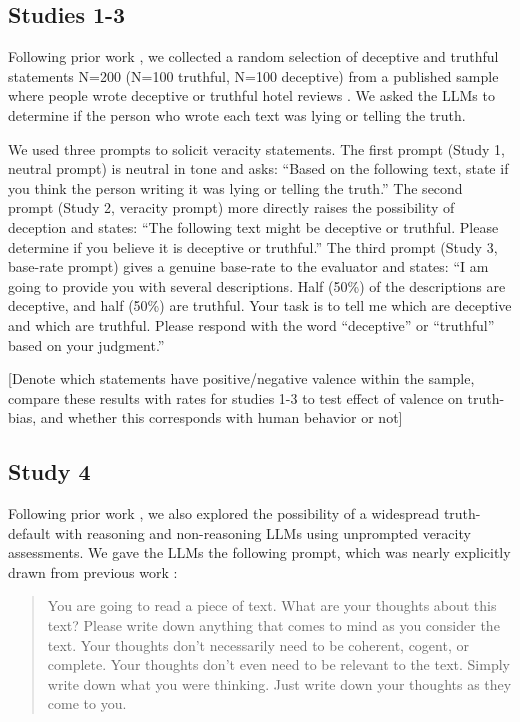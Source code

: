 \documentclass{article}
\begin{document}
\subsection{Studies 1-3}

Following prior work \citep{markowitz_generative_2024}, we collected a random selection of deceptive and truthful statements N=200 (N=100 truthful, N=100 deceptive) from a published sample where people wrote deceptive or truthful hotel reviews \citep{ott_finding_2011}. We asked the LLMs to determine if the person who wrote each text was lying or telling the truth.

We used three prompts to solicit veracity statements. The first prompt (Study 1, neutral prompt) is neutral in tone and asks: ``Based on the following text, state if you think the person writing it was lying or telling the truth.'' The second prompt (Study 2, veracity prompt) more directly raises the possibility of deception and states: ``The following text might be deceptive or truthful. Please determine if you believe it is deceptive or truthful.'' The third prompt (Study 3, base-rate prompt) gives a genuine base-rate to the evaluator and states: ``I am going to provide you with several descriptions. Half (50\%) of the descriptions are deceptive, and half (50\%) are truthful. Your task is to tell me which are deceptive and which are truthful. Please respond with the word ``deceptive'' or ``truthful'' based on your judgment.''

[Denote which statements have positive/negative valence within the sample, compare these results with rates for studies 1-3 to test effect of valence on truth-bias, and whether this corresponds with human behavior or not]

\subsection{Study 4}

Following prior work \citep{markowitz_generative_2024, clare_documenting_2019}, we also explored the possibility of a widespread truth-default with reasoning and non-reasoning LLMs using unprompted veracity assessments. We gave the LLMs the following prompt, which was nearly explicitly drawn from previous work \citep{clare_documenting_2019}:

\begin{quote}
    You are going to read a piece of text. What are your thoughts about this text? Please write down anything that comes to mind as you consider the text. Your thoughts don’t necessarily need to be coherent, cogent, or complete. Your thoughts don’t even need to be relevant to the text. Simply write down what you were thinking. Just write down your thoughts as they come to you.
\end{quote}
\end{document}
